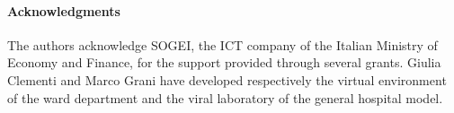 \paragraph*{Acknowledgments}

The authors acknowledge SOGEI, the ICT company of the Italian Ministry of Economy and Finance, for the support provided through several grants. Giulia Clementi and Marco Grani have developed respectively the virtual environment of the ward department and the viral laboratory of the general hospital model.

